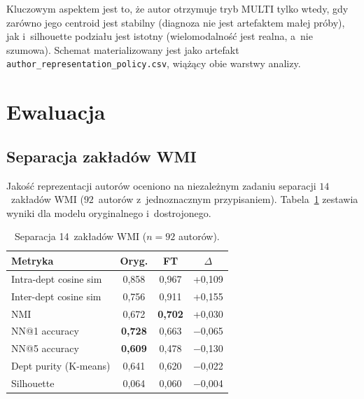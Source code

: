 \documentclass[a4paper,11pt,twocolumn]{article}
\begin{document}
Kluczowym aspektem jest to, że autor otrzymuje tryb MULTI tylko wtedy,
gdy zarówno jego centroid jest stabilny (diagnoza nie jest artefaktem
małej próby), jak i~silhouette podziału jest istotny (wielomodalność
jest realna, a~nie szumowa). Schemat materializowany jest jako artefakt
\texttt{author\_representation\_policy.csv}, wiążący obie warstwy analizy.



\section{Ewaluacja}
\label{sec:eval}


\subsection{Separacja zakładów WMI}

Jakość reprezentacji autorów oceniono na niezależnym zadaniu separacji
$14$~zakładów WMI ($92$~autorów z~jednoznacznym przypisaniem).
Tabela~\ref{tab:dept} zestawia wyniki dla modelu oryginalnego
i~dostrojonego.

\begin{table}[t]
\centering
\caption{Separacja 14~zakładów WMI ($n=92$ autorów).}
\label{tab:dept}
\small
\begin{tabular}{@{}lccc@{}}
\toprule
Metryka & Oryg. & FT & $\Delta$ \\
\midrule
Intra-dept cosine sim    & 0,858 & 0,967 & +0,109 \\
Inter-dept cosine sim    & 0,756 & 0,911 & +0,155 \\
NMI                      & 0,672 & \textbf{0,702} & +0,030 \\
NN@1 accuracy            & \textbf{0,728} & 0,663 & $-$0,065 \\
NN@5 accuracy            & \textbf{0,609} & 0,478 & $-$0,130 \\
Dept purity (K-means)    & 0,641 & 0,620 & $-$0,022 \\
Silhouette               & 0,064 & 0,060 & $-$0,004 \\
\bottomrule
\end{tabular}
\end{table}
\end{document}
